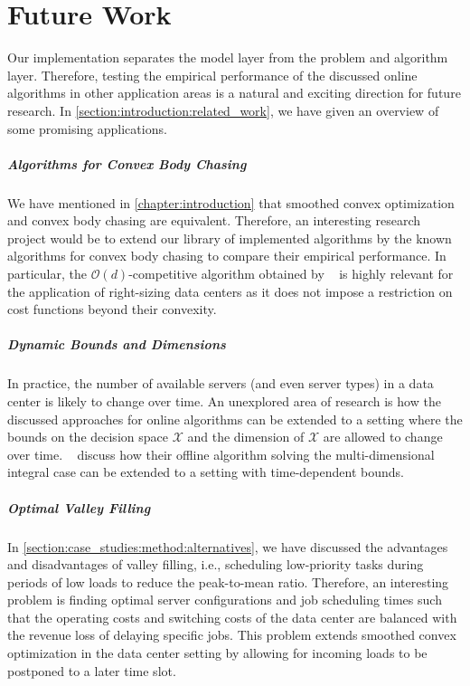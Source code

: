 
\chapter{Future Work}\label{chapter:future_work}

Our implementation separates the model layer from the problem and algorithm layer. Therefore, testing the empirical performance of the discussed online algorithms in other application areas is a natural and exciting direction for future research. In \cref{section:introduction:related_work}, we have given an overview of some promising applications.

\paragraph{Algorithms for Convex Body Chasing} We have mentioned in \autoref{chapter:introduction} that smoothed convex optimization and convex body chasing are equivalent. Therefore, an interesting research project would be to extend our library of implemented algorithms by the known algorithms for convex body chasing to compare their empirical performance. In particular, the $\mathcal{O}(d)$-competitive algorithm obtained by \citeauthor*{Argue2019}~\cite{Argue2019} is highly relevant for the application of right-sizing data centers as it does not impose a restriction on cost functions beyond their convexity.

\paragraph{Dynamic Bounds and Dimensions} In practice, the number of available servers (and even server types) in a data center is likely to change over time. An unexplored area of research is how the discussed approaches for online algorithms can be extended to a setting where the bounds on the decision space $\mathcal{X}$ and the dimension of $\mathcal{X}$ are allowed to change over time. \citeauthor*{Albers2021_2}~\cite{Albers2021_2} discuss how their offline algorithm solving the multi-dimensional integral case can be extended to a setting with time-dependent bounds.

\paragraph{Optimal Valley Filling} In \cref{section:case_studies:method:alternatives}, we have discussed the advantages and disadvantages of valley filling, i.e., scheduling low-priority tasks during periods of low loads to reduce the peak-to-mean ratio. Therefore, an interesting problem is finding optimal server configurations and job scheduling times such that the operating costs and switching costs of the data center are balanced with the revenue loss of delaying specific jobs. This problem extends smoothed convex optimization in the data center setting by allowing for incoming loads to be postponed to a later time slot.

